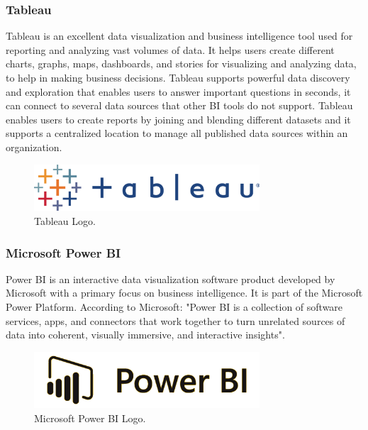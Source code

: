 \subsubsection{Tableau}
\label{sec:tableau}
Tableau is an excellent data visualization and business intelligence tool used for reporting and analyzing vast volumes of data. It helps users create different charts, graphs, maps, dashboards, and stories for visualizing and analyzing data, to help in making business decisions. Tableau supports powerful data discovery and exploration that enables users to answer important questions in seconds, it can connect to several data sources that other BI tools do not support. Tableau enables users to create reports by joining and blending different datasets and it supports a centralized location to manage all published data sources within an organization\cite{WhatTableauUltimate}.
\begin{figure}[h!]
    \center
    \includegraphics[width=0.75\textwidth]{images/chapter4/TableauLogo.png}
    \caption{Tableau Logo.}
    \label{fig:tableau}
\end{figure}

\subsubsection{Microsoft Power BI}
Power BI is an interactive data visualization software product developed by Microsoft with a primary focus on business intelligence. It is part of the Microsoft Power Platform. According to Microsoft: "Power BI is a collection of software services, apps, and connectors that work together to turn unrelated sources of data into coherent, visually immersive, and interactive insights"\cite{DataVisualisationMicrosoft}.
\begin{figure}[h!]
    \center
    \includegraphics[width=0.75\textwidth]{images/chapter4/powerBi.png}
    \caption{Microsoft Power BI Logo.}
    \label{fig:powerBi}
\end{figure}

